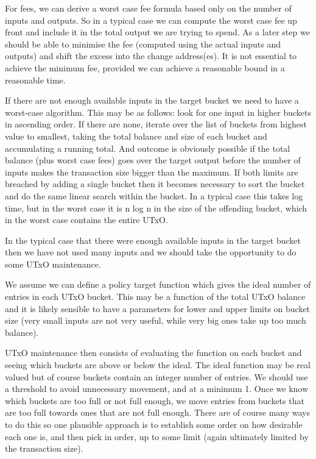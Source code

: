 \documentclass{article}
\begin{document}
For fees, we can derive a worst case fee formula based only on the number of
inputs and outputs. So in a typical case we can compute the worst case fee up
front and include it in the total output we are trying to spend. As a later
step we should be able to minimise the fee (computed using the actual inputs
and outputs) and shift the excess into the change address(es). It is not
essential to achieve the minimum fee, provided we can achieve a reasonable
bound in a reasonable time.

If there are not enough available inputs in the target bucket we need to have
a worst-case algorithm. This may be as follows: look for one input in higher
buckets in ascending order. If there are none, iterate over the list of buckets
from highest value to smallest, taking the total balance and size of each bucket
and accumulating a running total. And outcome is obviously possible if the total
balance (plus worst case fees) goes over the target output before the number of
inputs makes the transaction size bigger than the maximum. If both limits are
breached by adding a single bucket then it becomes necessary to sort the bucket
and do the same linear search within the bucket. In a typical case this takes
log time, but in the worst case it is n log n in the size of the offending
bucket, which in the worst case contains the entire UTxO.

In the typical case that there were enough available inputs in the target
bucket then we have not used many inputs and we should take the opportunity
to do some UTxO maintenance.

We assume we can define a policy target function which gives the ideal number
of entries in each UTxO bucket. This may be a function of the total UTxO
balance and it is likely sensible to have a parameters for lower and upper
limits on bucket size (very small inputs are not very useful, while very big
ones take up too much balance).

UTxO maintenance then consists of evaluating the function on each bucket and
seeing which buckets are above or below the ideal. The ideal function may be
real valued but of course buckets contain an integer number of entries. We
should use a threshold to avoid unnecessary movement, and at a minimum 1. Once
we know which buckets are too full or not full enough, we move entries from
buckets that are too full towards ones that are not full enough. There are of
course many ways to do this so one plausible approach is to establish some
order on how desirable each one is, and then pick in order, up to some limit
(again ultimately limited by the transaction size).
\end{document}
